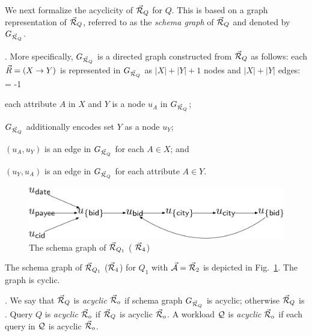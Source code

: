 
We next formalize the acyclicity of \bds $\vec{{\mathcal R}}_{Q}$ for $Q$.
This is based on a graph representation of $\vec{{\mathcal R}}_{Q}$, referred to
as the {\em schema graph} of $\vec{{\mathcal R}}_{Q}$ and denoted by
$G_{\vec{{\mathcal R}}_{Q}}$.


. More specifically, $G_{\vec{{\mathcal R}}_{Q}}$ is a
directed graph constructed from $\vec{{\mathcal R}}_{Q}$ as follows: each \bs
$\vec{R} = (X\rightarrow Y)$ is represented in $G_{\vec{{\mathcal R}}_{Q}}$ as $|X|+|Y|+1$
nodes and $|X|+|Y|$ edges:
\looseness = -1
\mbi
\item each attribute $A$ in $X$ and $Y$ is a node $u_{A}$ in $G_{\vec{{\mathcal R}}_{Q}}$;
\item $G_{\vec{{\mathcal R}}_{Q}}$ additionally encodes set $Y$ as a node $u_{Y}$;
\item $(u_{A}, u_{Y})$ is an edge in $G_{\vec{{\mathcal R}}_{Q}}$ for each $A\in X$; and
\item $(u_{Y}, u_{A})$ is an edge in $G_{\vec{{\mathcal R}}_{Q}}$ for each attribute $A\in Y$.
\mei 

\begin{figure}
\includegraphics[width=1\columnwidth]{fig/schemagraph.pdf}
\caption{The schema graph of $\vec{{\mathcal R}}_{Q_{1}}$ (\ie
  $\vec{{\mathcal R}}_{4}$) \label{fig-schemagraph}}
\vspace{-2ex}
\end{figure}

\begin{example}\label{exa-schemagraph}
The schema graph of $\vec{{\mathcal R}}_{Q_{1}}$ (\ie $\vec{{\mathcal R}}_{4}$) for
$Q_{1}$ with $\vec{{\mathcal A}} = \vec{{\mathcal R}}_{2}$ is depicted in
Fig.~\ref{fig-schemagraph}. The graph is cyclic.
\end{example}


.
We say that $\vec{{\mathcal R}}_{Q}$ is {\em acyclic \wrt $\vec{{\mathcal R}}_{o}$} if schema
graph $G_{\vec{{\mathcal R}}_{Q}}$ is acyclic; otherwise $\vec{{\mathcal R}}_{Q}$ is
. Query $Q$ is {\em acyclic} \wrt $\vec{{\mathcal R}}_{o}$ if
$\vec{{\mathcal R}}_{Q}$ is acyclic \wrt $\vec{{\mathcal R}}_{o}$. A workload $\mathcal Q$ is
{\em acyclic} \wrt $\vec{{\mathcal R}}_{o}$ if each query in $\mathcal Q$ is acyclic \wrt
$\vec{{\mathcal R}}_{o}$.


